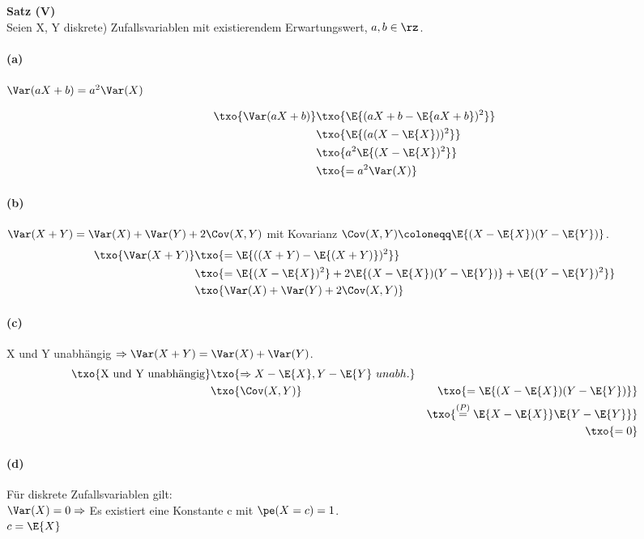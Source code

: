 \begin{satz}
    \textbf{Satz (V)} \label{satz:satz-v}   \\
    Seien X, Y diskrete) Zufallsvariablen mit existierendem Erwartungswert, $a,b \in \rz$.

    \paragraph{(a)} $\Var(aX+b) = a^2 \Var(X)$

    \begin{align*}
        \txo{\Var(aX+b)} & \txo{ \E{ (aX+b - \E{aX+b} )^2 } } \\
        & \txo{ \E{ (a (X-\E{X}  ))^2 } } \\
        & \txo{ a^2 \E{(X- \E{X} )^2} } \\
        & \txo{= a^2 \Var(X)}
    \end{align*}


    \paragraph{(b)} $\Var(X + Y ) = \Var(X ) + \Var(Y ) + 2 \Cov(X , Y )$ mit Kovarianz
    $\Cov(X,Y) \coloneqq \E{(X-\E{X}) (Y-\E{Y})}$.
    \begin{align*}
        \txo{\Var(X + Y )} & \txo{= \E{ ( (X+Y) - \E{(X+Y)} )^2 } } \\
        & \txo{= \E{ (X-\E{X})^2 }  + 2 \E{ (X-\E{X}) (Y-\E{Y}) } + \E{(Y-\E{Y})^2}  } \\
        & \txo{  \Var(X ) + \Var(Y ) + 2 \Cov(X , Y ) }
    \end{align*}

    \paragraph{(c)} X und Y unabhängig $\Rightarrow \Var(X + Y ) = \Var(X ) + \Var(Y )$.
    \begin{align*}
        \txo{\text{X und Y unabhängig}} & \txo{\Rightarrow X-\E{X}, Y-\E{Y}\ unabh.} \\
        &  \txo{\Cov(X,Y)} & \txo{= \E{(X-\E{X}) (Y-\E{Y})}} \\
        & & \txo{ \overset{(P)}{=}  \E{X-\E{X}} \E{Y-\E{Y}}} \\
        & & \txo{=0}
    \end{align*}

    \paragraph{(d)} Für diskrete Zufallsvariablen gilt: \\
    $\Var(X ) = 0 \Rightarrow$ Es existiert eine Konstante c mit $\pe(X=c) = 1$. \\
    $c = \E{X}$


\end{satz}
